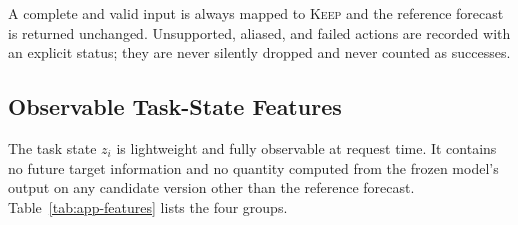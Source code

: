 \documentclass{article}
\begin{document}
\begin{table}[h]
  \caption{The five legal governance actions. ``Observed entries'' refers to entries that
  are present and valid in $X_i^{a_0}$; an action that modified them would be a data
  integrity violation regardless of its forecasting effect.}
  \label{tab:app-catalog}
  \centering
  \small
  \setlength{\tabcolsep}{4pt}
\end{table}

A complete and valid input is always mapped to \textsc{Keep} and the reference forecast is
returned unchanged. Unsupported, aliased, and failed actions are recorded with an explicit
status; they are never silently dropped and never counted as successes.

\subsection{Observable Task-State Features}
\label{app:features}
The task state $z_i$ is lightweight and fully observable at request time. It
contains no future target information and no quantity computed from the frozen model's
output on any candidate version other than the reference forecast. Table~\ref{tab:app-features}
lists the four groups.
\end{document}
